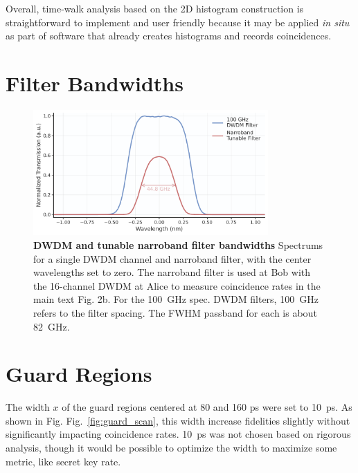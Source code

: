 \documentclass[11pt]{caltech_thesis} %
\begin{document}
Overall, time-walk analysis based on the 2D histogram construction is straightforward to implement and user friendly because it may be applied \textit{in situ} as part of software that already creates histograms and records coincidences.

\hypertarget{filter-bandwidths}{%
\section{Filter Bandwidths}\label{filter-bandwidths}}

\hypertarget{fig:bandwidths}{%
\begin{figure}
\centering
\includegraphics[width=0.8\textwidth,height=\textheight]{./chapter_05/figs/filter_comparison_light.pdf}
\caption[{DWDM and tunable narroband filter bandwidths}]{\textbf{DWDM and tunable narroband filter bandwidths} Spectrums for a single DWDM channel and narroband filter, with the center wavelengths set to zero. The narroband filter is used at Bob with the 16-channel DWDM at Alice to measure coincidence rates in the main text Fig. 2b. For the 100~GHz spec. DWDM filters, 100~GHz refers to the filter spacing. The FWHM passband for each is about 82~GHz.}
\label{fig:bandwidths}
\end{figure}
}

\hypertarget{guard-regions}{%
\section{Guard Regions}\label{guard-regions}}

The width $x$ of the guard regions centered at 80 and 160 ps were set to 10~ps. As shown in Fig. Fig.~\ref{fig:guard_scan}, this width increase fidelities slightly without significantly impacting coincidence rates. 10~ps was not chosen based on rigorous analysis, though it would be possible to optimize the width to maximize some metric, like secret key rate.
\end{document}
